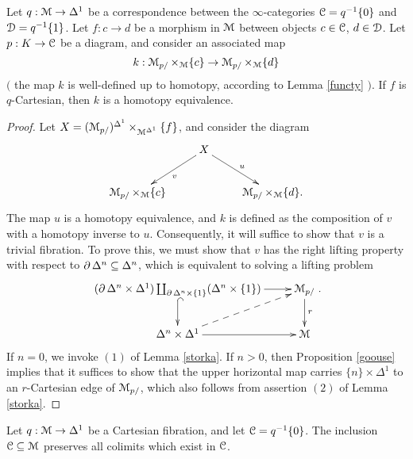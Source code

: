 \begin{lemma}\label{lotusk}
Let $q: \operatorname{\mathcal{M}} \rightarrow \Delta^1$ be a correspondence between the $\infty$-categories
$\operatorname{\mathcal{C}} = q^{-1} \{0\}$ and $\operatorname{\mathcal{D}} = q^{-1} \{1 \}$. Let $f: c \rightarrow d$ be a morphism
in $\operatorname{\mathcal{M}}$ between objects $c \in \operatorname{\mathcal{C}}$, $d \in \operatorname{\mathcal{D}}$. Let $p: K \rightarrow \operatorname{\mathcal{C}}$
be a diagram, and consider an associated map
$$ k: \operatorname{\mathcal{M}}_{p/} \times_{\operatorname{\mathcal{M}}} \{c\} \rightarrow \operatorname{\mathcal{M}}_{p/} \times_{\operatorname{\mathcal{M}}} \{d\}$$
$($ the map $k$ is well-defined up to homotopy, according to Lemma \ref{functy} $)$.
If $f$ is $q$-Cartesian, then $k$ is a homotopy equivalence.
\end{lemma}

\begin{proof}
Let $X = (\operatorname{\mathcal{M}}_{p/})^{\Delta^1} \times_{\operatorname{\mathcal{M}}^{\Delta^1} } \{f\}$, and consider the diagram
$$ \xymatrix{ & X \ar[dr]^{u} \ar[dl]^{v} & \\
\calM_{p/} \times_{\calM} \{c\} & & \calM_{p/} \times_{\calM} \{d\}.}$$
The map $u$ is a homotopy equivalence, and $k$ is defined as the composition
of $v$ with a homotopy inverse to $u$. Consequently, it will suffice to show that
$v$ is a trivial fibration. To prove this, we must show that $v$ has the right lifting
property with respect to $\operatorname{\partial} \Delta^n \subseteq \Delta^n$, which is equivalent to solving a lifting problem
$$ \xymatrix{ (\bd \Delta^n \times \Delta^1) \coprod_{ \bd \Delta^n \times \{1\} } (\Delta^n \times \{1\}) \ar[r] \ar@{^{(}->}[d] & \calM_{p/} \ar[d]^{r} \\
\Delta^n \times \Delta^1 \ar[r] \ar@{-->}[ur] & \calM}.$$
If $n=0$, we invoke $(1)$ of Lemma \ref{storka}. If $n > 0$, then Proposition \ref{goouse} implies
that it suffices to show that the upper horizontal map carries $\{n \} \times \Delta^1$
to an $r$-Cartesian edge of $\operatorname{\mathcal{M}}_{p/}$, which also follows from assertion $(2)$ of Lemma \ref{storka}.
\end{proof}

\begin{lemma}\label{lotuss}
Let $q: \operatorname{\mathcal{M}} \rightarrow \Delta^1$ be a Cartesian fibration, and let $\operatorname{\mathcal{C}} = q^{-1} \{0\}$.
The inclusion $\operatorname{\mathcal{C}} \subseteq \operatorname{\mathcal{M}}$ preserves all colimits which exist in $\operatorname{\mathcal{C}}$.
\end{lemma}

